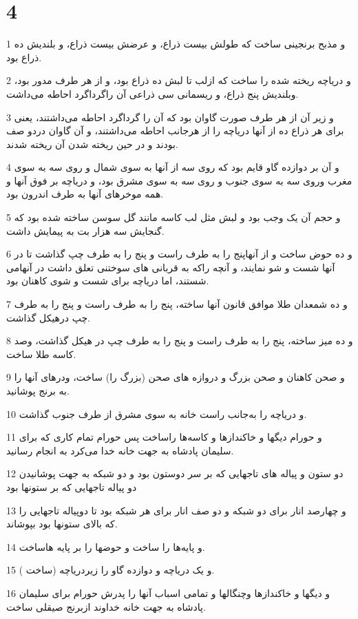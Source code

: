 \chapter{4}

\par 1 و مذبح برنجینی ساخت که طولش بیست ذراع، و عرضش بیست ذراع، و بلندیش ده ذراع بود.
\par 2 و دریاچه ریخته شده را ساخت که ازلب تا لبش ده ذراع بود، و از هر طرف مدور بود، وبلندیش پنج ذراع، و ریسمانی سی ذراعی آن راگرداگرد احاطه می‌داشت.
\par 3 و زیر آن از هر طرف صورت گاوان بود که آن را گرداگرد احاطه می‌داشتند، یعنی برای هر ذراع ده از آنها دریاچه را از هرجانب احاطه می‌داشتند، و آن گاوان دردو صف بودند و در حین ریخته شدن آن ریخته شدند.
\par 4 و آن بر دوازده گاو قایم بود که روی سه از آنها به سوی شمال و روی سه به سوی مغرب وروی سه به سوی جنوب و روی سه به سوی مشرق بود، و دریاچه بر فوق آنها و همه موخرهای آنها به طرف اندرون بود.
\par 5 و حجم آن یک وجب بود و لبش مثل لب کاسه مانند گل سوسن ساخته شده بود که گنجایش سه هزار بت به پیمایش داشت.
\par 6 و ده حوض ساخت و از آنهاپنج را به طرف راست و پنج را به طرف چپ گذاشت تا در آنها شست و شو نمایند، و آنچه راکه به قربانی های سوختنی تعلق داشت در آنهامی شستند، اما دریاچه برای شست و شوی کاهنان بود.
\par 7 و ده شمعدان طلا موافق قانون آنها ساخته، پنج را به طرف راست و پنج را به طرف چپ درهیکل گذاشت.
\par 8 و ده میز ساخته، پنج را به طرف راست و پنج را به طرف چپ در هیکل گذاشت، وصد کاسه طلا ساخت.
\par 9 و صحن کاهنان و صحن بزرگ و دروازه های صحن (بزرگ را) ساخت، ودرهای آنها را به برنج پوشانید.
\par 10 و دریاچه را به‌جانب راست خانه به سوی مشرق از طرف جنوب گذاشت.
\par 11 و حورام دیگها و خاکندازها و کاسه‌ها راساخت پس حورام تمام کاری که برای سلیمان پادشاه به جهت خانه خدا می‌کرد به انجام رسانید.
\par 12 دو ستون و پیاله های تاجهایی که بر سر دوستون بود و دو شبکه به جهت پوشانیدن دو پیاله تاجهایی که بر ستونها بود
\par 13 و چهارصد انار برای دو شبکه و دو صف انار برای هر شبکه بود تا دوپیاله تاجهایی را که بالای ستونها بود بپوشاند.
\par 14 و پایه‌ها را ساخت و حوضها را بر پایه هاساخت.
\par 15 و یک دریاچه و دوازده گاو را زیردریاچه (ساخت ).
\par 16 و دیگها و خاکندازها وچنگالها و تمامی اسباب آنها را پدرش حورام برای سلیمان پادشاه به جهت خانه خداوند ازبرنج صیقلی ساخت.
